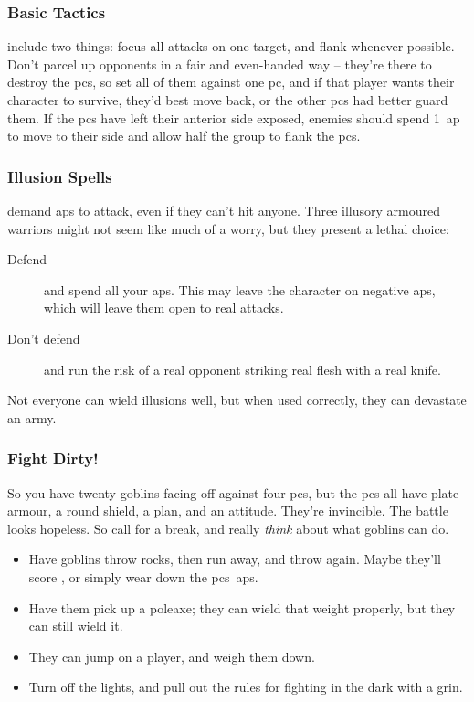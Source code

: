 \begin{multicols}{2}
\subsubsection{Basic Tactics}
include two things: focus all attacks on one target, and flank whenever possible.
Don't parcel up opponents in a fair and even-handed way -- they're there to destroy the \glspl{pc}, so set all of them against one \gls{pc}, and if that player wants their character to survive, they'd best move back, or the other \glspl{pc} had better guard them.%
If the \glspl{pc} have left their anterior side exposed, enemies should spend 1~\gls{ap} to move to their side and allow half the group to flank the \glspl{pc}.

\subsubsection{Illusion Spells}
demand \glspl{ap} to attack, even if they can't hit anyone.
Three illusory armoured warriors might not seem like much of a worry, but they present a lethal choice:

\begin{description}
  \item[Defend]
  and spend all your \glspl{ap}.
  This may leave the character on negative \glspl{ap}, which will leave them open to real attacks.
  \item[Don't defend]
  and run the risk of a real opponent striking real flesh with a real knife. 
\end{description}

Not everyone can wield illusions well, but when used correctly, they can devastate an army.

\subsubsection{Fight Dirty!}
So you have twenty goblins facing off against four \glspl{pc}, but the \glspl{pc} all have plate armour, a round shield, a plan, and an attitude.
They're invincible.
The battle looks hopeless.
So call for a break, and really \textit{think} about what goblins can do.

\begin{itemize}
  \item
  Have goblins throw rocks, then run away, and throw again.
  Maybe they'll score , or simply wear down the \glspl{pc}~\glspl{ap}.
  \item
  Have them pick up a poleaxe; they can wield that weight properly, but they can still wield it.
  \item
  They can jump on a player, and weigh them down.
  \item
  Turn off the lights, and pull out the rules for fighting in the dark with a grin.%
\end{itemize}


\end{multicols}
